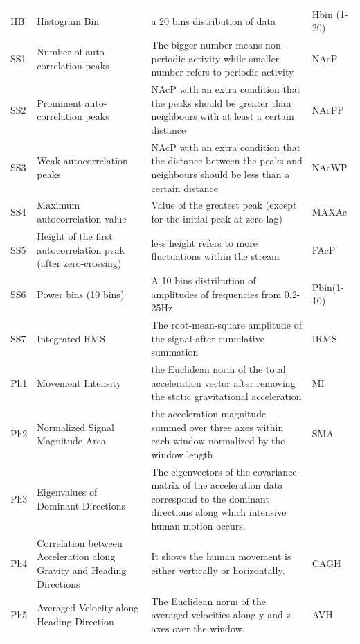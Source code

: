 \documentclass[journal,article,submit,moreauthors,pdftex]{Definitions/mdpi}
\begin{document}
\begin{table}[H]
\begin{tabular}{p{0.9cm}p{5cm}p{7cm}p{1.3cm}}
		{\footnotesize HB}& Histogram Bin&{\scriptsize a 20 bins distribution of data } & Hbin (1-20) \\
		{\footnotesize SS1}&Number of auto-correlation peaks& {\scriptsize The bigger number means non-periodic activity while smaller number refers to periodic activity }& NAcP\\
		{\footnotesize SS2}&Prominent auto-correlation peaks&{\scriptsize NAcP with an extra condition that the peaks should be greater than neighbours with at least a certain distance} & NAcPP \\
		{\footnotesize SS3}&Weak autocorrelation peaks&{\scriptsize NAcP with an extra condition that the distance between the peaks and neighbours should be less than a certain distance} & NAcWP \\
		{\footnotesize SS4}&Maximum autocorrelation value&{\scriptsize Value of the greatest peak (except for the initial peak at zero lag)} & MAXAc \\
		{\footnotesize SS5}&Height of the first autocorrelation peak (after zero-crossing)&{\scriptsize less height refers to more fluctuations within the stream  } & FAcP \\
		{\footnotesize SS6}&Power bins (10 bins)&{\scriptsize A 10 bins distribution of amplitudes of frequencies from 0.2-25Hz    } & Pbin(1-10) \\
		{\footnotesize SS7}&Integrated RMS&{\scriptsize The root-mean-square amplitude of the signal after cumulative summation } & IRMS \\
		Ph1&Movement Intensity&{\scriptsize the Euclidean norm of the total acceleration vector after removing the static gravitational acceleration } & MI\\
		Ph2&Normalized Signal Magnitude Area&{\scriptsize the acceleration magnitude summed over three axes within each window normalized by the window length } & SMA \\
		Ph3&Eigenvalues of Dominant Directions&{\scriptsize The eigenvectors of the covariance matrix of the acceleration data correspond to the dominant directions along which intensive human motion occurs.} & \\
		Ph4&Correlation between Acceleration along Gravity and Heading Directions&{\scriptsize It shows the human movement is either vertically or horizontally. } &CAGH \\
		Ph5&Averaged Velocity along Heading Direction&{\scriptsize The Euclidean norm of the averaged velocities along y and z axes over the window.} &AVH \\

\end{tabular}
\end{table}
\end{document}
